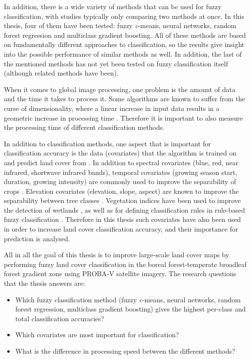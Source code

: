 \documentclass[a4paper,12pt]{scrbook}
\begin{document}
In addition, there is a wide variety of methods that can be used for fuzzy classification, with studies typically only comparing two methods at once. In this thesis, four of them have been tested: fuzzy \textit{c}-means, neural networks, random forest regression and multiclass gradient boosting. All of these methods are based on fundamentally different approaches to classification, so the results give insight into the possible performance of similar methods as well. In addition, the last of the mentioned methods has not yet been tested on fuzzy classification itself (although related methods have been).

When it comes to global image processing, one problem is the amount of data and the time it takes to process it. Some algorithms are known to suffer from the curse of dimensionality, where a linear increase in input data results in a geometric increase in processing time \citep{walton2008subpixelrf}. Therefore it is important to also measure the processing time of different classification methods.

In addition to classification methods, one aspect that is important for classification accuracy is the data (covariates) that the algorithm is trained on and predict land cover from \citep{yu2014metadiscoveries}. In addition to spectral covariates (blue, red, near infrared, shortwave infrared bands), temporal covariates (growing season start, duration, growing intensity) are commonly used to improve the separability of crops \citep{jakubauskas2001harmonic}. Elevation covariates (elevation, slope, aspect) are known to improve the separability between tree classes \citep{burrough2001fuzzy}. Vegetation indices have been used to improve the detection of wetlands \citep{sader1995wetlands}, as well as for defining classification rules in rule-based fuzzy classification \citep{baraldi2006rulebased}. Therefore in this thesis such covariates have also been used in order to increase land cover classification accuracy, and their importance for prediction is analysed.

All in all the goal of this thesis is to improve large-scale land cover maps by performing fuzzy land cover classification in the boreal forest-temperate broadleaf forest gradient zone using PROBA-V satellite imagery. The research questions that the thesis answers are:

\begin{itemize}
 \item Which fuzzy classification method (fuzzy \textit{c}-means, neural networks, random forest regression, multiclass gradient boosting) gives the highest per-class and total classification accuracies?
 \item Which covariates are most important for classification?
 \item What is the difference in processing speed between the different methods?
\end{itemize}
\end{document}
